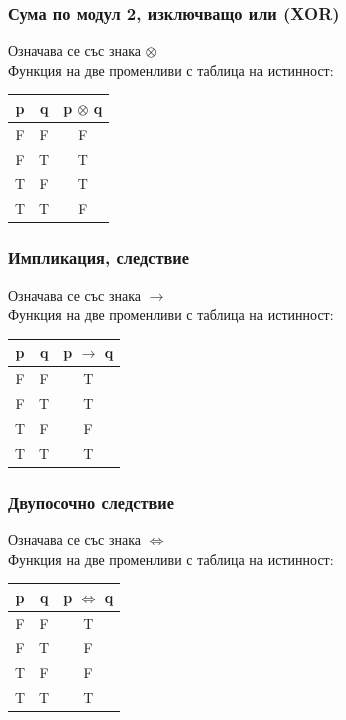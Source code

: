 \documentclass[fleqn, 12pt]{article}
\theoremstyle{definition}
\begin{document}
\newpage

\subsubsection{Сума по модул 2, изключващо или (XOR)}
Означава се със знака $\otimes$\\
Функция на две променливи с таблица на истинност: 
\begin{table}[htp]
  \begin{center}
    \begin{tabular}{|c|c|c|} 
\hline
      \textbf{p} & \textbf{q}  & \textbf{p $\otimes$ q} \\
      \hline
	F & F & F \\
\hline
	F & T & T \\
\hline
	T & F & T \\
\hline
 	T & T & F \\
\hline
    \end{tabular}
  \end{center}
\end{table}

\subsubsection{Импликация, следствие }
Означава се със знака $\rightarrow$\\
Функция на две променливи с таблица на истинност: 
\begin{table}[htp]
  \begin{center}
    \begin{tabular}{|c|c|c|} 
\hline
      \textbf{p} & \textbf{q}  & \textbf{p $\rightarrow$ q} \\
\hline
	F & F & T \\
 \hline
	F & T & T \\ 
\hline
	T & F & F \\ 
\hline
 	T & T & T \\ 
\hline
    \end{tabular}
  \end{center}
\end{table}

\subsubsection{Двупосочно следствие}
Означава се със знака $\Leftrightarrow$\\
Функция на две променливи с таблица на истинност: 
\begin{table}[htp]
  \begin{center}
    \begin{tabular}{|c|c|c|} 
\hline
      \textbf{p} & \textbf{q}  & \textbf{p $\Leftrightarrow$ q} \\
\hline
	F & F & T \\
\hline
	F & T & F \\
\hline
	T & F & F \\
\hline
 	T & T & T \\
\hline
    \end{tabular}
  \end{center}
\end{table}
\end{document}
